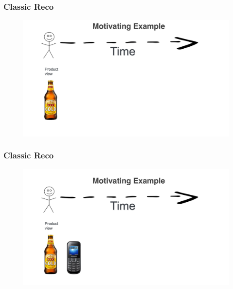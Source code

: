 \begin{frame}
  \frametitle{Classic Reco}
 
 
   \begin{figure}[h!]
     \includegraphics[scale=0.25]{images/mot_ex1a.png}
       \centering
       \label{motex1}
   \end{figure}
     
 \end{frame}


\begin{frame}
  \frametitle{Classic Reco}
 
 
   \begin{figure}[h!]
     \includegraphics[scale=0.25]{images/mot_ex1b.png}
       \centering
       \label{motex1}
   \end{figure}
     
 \end{frame}



